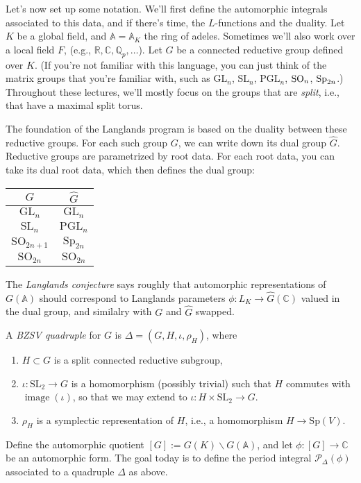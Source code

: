 \documentclass[reqno]{amsart} 
\numberwithin{theorem}{section}
\numberwithin{equation}{section}
\numberwithin{exercise}{section}
\begin{document}
Let's now set up some notation.  We'll first define the automorphic integrals associated to this data, and if there's time, the $L$-functions and the duality.  Let $K$ be a global field, and $\mathbb{A} = \mathbb{A}_K$ the ring of adeles.  Sometimes we'll also work over a local field $F$, (e.g., $\mathbb{R}, \mathbb{C}, \mathbb{Q}_p, \dotsc$).  Let $G$ be a connected reductive group defined over $K$.  (If you're not familiar with this language, you can just think of the matrix groups that you're familiar with, such as $\mathrm{GL}_n$, $\mathrm{SL}_n$, $\mathrm{PGL}_n$, $\operatorname{SO}_n$, $\operatorname{Sp}_{2 n}$.)  Throughout these lectures, we'll mostly focus on the groups that are \emph{split}, i.e., that have a maximal split torus.

The foundation of the Langlands program is based on the duality between these reductive groups.  For each such group $G$, we can write down its dual group $\hat{G}$.  Reductive groups are parametrized by root data.  For each root data, you can take its dual root data, which then defines the dual group:
\begin{tabular}{|c|c|}
  \hline
  $G$ & $\hat{G}$ \\
  \hline \hline
  $\mathrm{GL}_n$ & $\mathrm{GL}_n$ \\
  \hline
  $\mathrm{SL}_n$ & $\mathrm{PGL}_n$ \\
  \hline
  $\mathrm{SO}_{2n+1}$ & $\mathrm{Sp}_{2n}$ \\
  \hline
  $\mathrm{SO}_{2n}$ & $\mathrm{SO}_{2n}$ \\
  \hline
\end{tabular}

The \emph{Langlands conjecture} says roughly that automorphic representations of $G(\mathbb{A})$ should correspond to Langlands parameters $\phi : L_K \rightarrow \hat{G}(\mathbb{C})$ valued in the dual group, and similalry with $G$ and $\hat{G}$ swapped.

\begin{definition}\label{definition:cq6tho3qgh}
  A \emph{BZSV quadruple} for $G$ is $\Delta =(G, H, \iota, \rho_H)$, where
  \begin{enumerate}
  \item\label{enumerate:cq6tg8um5h} $H \subset G$ is a split connected reductive subgroup,
  \item\label{enumerate:cq6tg8uyi6} $\iota : \mathrm{SL}_2 \rightarrow G$ is a homomorphism (possibly trivial) such that $H$ commutes with $\operatorname{image}(\iota)$, so that we may extend to $\iota : H \times \mathrm{SL}_2 \rightarrow G$.
  \item\label{enumerate:cq6tg8wpyk} $\rho_H$ is a symplectic representation of $H$, i.e., a homomorphism $H \rightarrow \mathrm{Sp}(V)$.
  \end{enumerate}
\end{definition}
Define the automorphic quotient $[G] := G(K) \backslash G(\mathbb{A})$, and let $\phi :[G] \rightarrow \mathbb{C}$ be an automorphic form.  The goal today is to define the period integral $\mathcal{P}_\Delta(\phi)$ associated to a quadruple $\Delta$ as above.
\end{document}
